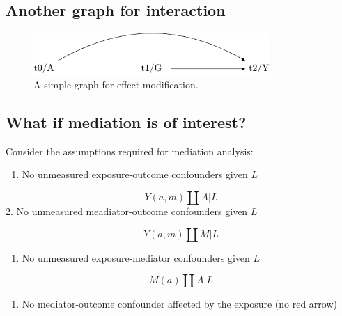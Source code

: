 \documentclass[
  singlecolumn]{report}
\providecommand{\tightlist}{%
  \setlength{\itemsep}{0pt}\setlength{\parskip}{0pt}}\usepackage{longtable,booktabs,array}
\begin{document}
\hypertarget{another-graph-for-interaction}{%
\subsection{Another graph for
interaction}\label{another-graph-for-interaction}}

\begin{figure}

{\centering \includegraphics[width=0.8\textwidth,height=\textheight]{causal-dags_files/figure-pdf/fig-dag-effect-modfication-2-1.pdf}

}

\caption{\label{fig-dag-effect-modfication-2}A simple graph for
effect-modification.}

\end{figure}

\hypertarget{what-if-mediation-is-of-interest}{%
\subsection{What if mediation is of
interest?}\label{what-if-mediation-is-of-interest}}

Consider the assumptions required for mediation analysis:

\begin{enumerate}
\def\labelenumi{\arabic{enumi}.}
\tightlist
\item
  No unmeasured exposure-outcome confounders given \(L\)
\end{enumerate}

\[Y(a,m)\coprod A|L\] 2. No unmeasured meadiator-outcome confounders
given \(L\)

\[Y(a,m)\coprod M|L\]

\begin{enumerate}
\def\labelenumi{\arabic{enumi}.}
\setcounter{enumi}{2}
\tightlist
\item
  No unmeasured exposure-mediator confounders given \(L\)
\end{enumerate}

\[M(a)\coprod A|L\]

\begin{enumerate}
\def\labelenumi{\arabic{enumi}.}
\setcounter{enumi}{3}
\tightlist
\item
  No mediator-outcome confounder affected by the exposure (no red arrow)
\end{enumerate}
\end{document}
